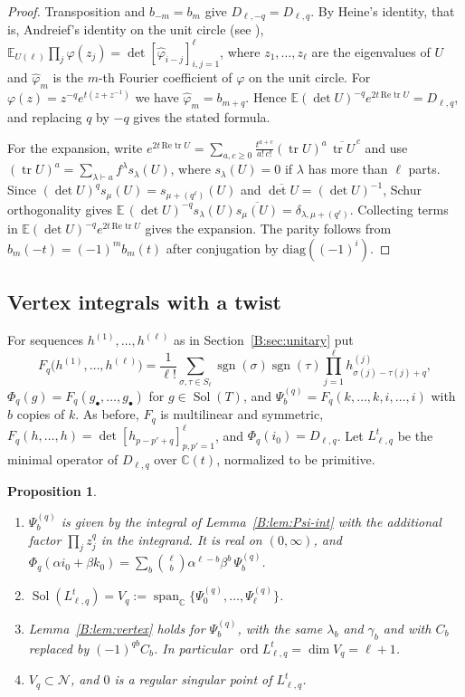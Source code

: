 \documentclass[11pt,a4paper]{article}
\newtheorem{proposition}[theorem]{Proposition}
\theoremstyle{definition}
\theoremstyle{remark}
\newcommand{\C}{\mathbb C}
\newcommand{\E}{\mathbb E}
\DeclareMathOperator{\ord}{ord}
\DeclareMathOperator{\Sol}{Sol}
\DeclareMathOperator{\sgn}{sgn}
\DeclareMathOperator{\spn}{span}
\DeclareMathOperator{\tr}{tr}
\numberwithin{equation}{section}
\begin{document}
\begin{proof}
Transposition and $b_{-m}=b_m$ give $D_{\ell,-q}=D_{\ell,q}$. By Heine's identity, that is, Andreief's identity on the unit circle (see \cite{BR01}), $\E_{U(\ell)}\prod_j\varphi(z_j)=\det[\hat\varphi_{i-j}]_{i,j=1}^{\ell}$, where $z_1,\dots,z_\ell$ are the eigenvalues of $U$ and $\hat\varphi_m$ is the $m$-th Fourier coefficient of $\varphi$ on the unit circle. For $\varphi(z)=z^{-q}e^{t(z+z^{-1})}$ we have $\hat\varphi_m=b_{m+q}$. Hence $\E(\det U)^{-q}e^{2t\,\mathrm{Re}\tr U}=D_{\ell,q}$, and replacing $q$ by $-q$ gives the stated formula.

For the expansion, write $e^{2t\,\mathrm{Re}\tr U}=\sum_{a,c\ge0}\frac{t^{a+c}}{a!\,c!}(\tr U)^a\,\overline{\tr U}^{\,c}$ and use $(\tr U)^a=\sum_{\lambda\vdash a}f^\lambda s_\lambda(U)$, where $s_\lambda(U)=0$ if $\lambda$ has more than $\ell$ parts. Since $(\det U)^qs_\mu(U)=s_{\mu+(q^\ell)}(U)$ and $\overline{\det U}=(\det U)^{-1}$, Schur orthogonality gives $\E\,(\det U)^{-q}s_\lambda(U)\overline{s_\mu(U)}=\delta_{\lambda,\mu+(q^\ell)}$. Collecting terms in $\E(\det U)^{-q}e^{2t\,\mathrm{Re}\tr U}$ gives the expansion. The parity follows from $b_m(-t)=(-1)^mb_m(t)$ after conjugation by $\mathrm{diag}((-1)^i)$.
\end{proof}

\subsection{Vertex integrals with a twist}
For sequences $h^{(1)},\dots,h^{(\ell)}$ as in Section~\ref{B:sec:unitary} put
\[
F_q\bigl(h^{(1)},\dots,h^{(\ell)}\bigr)=\frac1{\ell!}\sum_{\sigma,\tau\in S_\ell}\sgn(\sigma)\sgn(\tau)\prod_{j=1}^{\ell}h^{(j)}_{\sigma(j)-\tau(j)+q},
\]
$\Phi_q(g)=F_q(g_\bullet,\dots,g_\bullet)$ for $g\in\Sol(T)$, and $\Psi^{(q)}_b=F_q(k,\dots,k,i,\dots,i)$ with $b$ copies of $k$. As before, $F_q$ is multilinear and symmetric, $F_q(h,\dots,h)=\det[h_{p-p'+q}]_{p,p'=1}^{\ell}$, and $\Phi_q(i_0)=D_{\ell,q}$. Let $L^t_{\ell,q}$ be the minimal operator of $D_{\ell,q}$ over $\C(t)$, normalized to be primitive.

\begin{proposition}\label{B:prop:twisted-basic}
\begin{enumerate}
\item[(a)] $\Psi^{(q)}_b$ is given by the integral of Lemma~\ref{B:lem:Psi-int} with the additional factor $\prod_jz_j^q$ in the integrand. It is real on $(0,\infty)$, and $\Phi_q(\alpha i_0+\beta k_0)=\sum_b\binom{\ell}{b}\alpha^{\ell-b}\beta^b\,\Psi^{(q)}_b$.
\item[(b)] $\Sol(L^t_{\ell,q})=V_q:=\spn_\C\{\Psi^{(q)}_0,\dots,\Psi^{(q)}_\ell\}$.
\item[(c)] Lemma~\ref{B:lem:vertex} holds for $\Psi^{(q)}_b$, with the same $\lambda_b$ and $\gamma_b$ and with $C_b$ replaced by $(-1)^{qb}C_b$. In particular $\ord L^t_{\ell,q}=\dim V_q=\ell+1$.
\item[(d)] $V_q\subset\mathcal N$, and $0$ is a regular singular point of $L^t_{\ell,q}$.
\end{enumerate}
\end{proposition}
\end{document}
